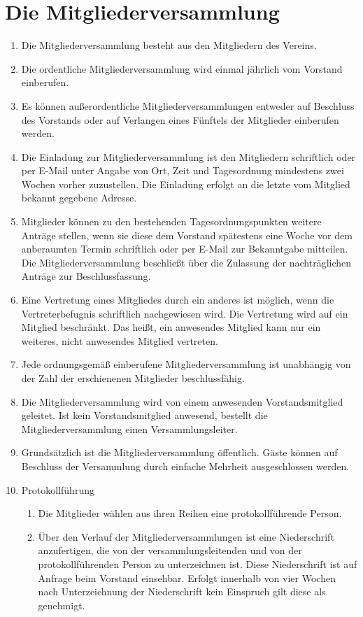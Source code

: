 \documentclass[a4paper, 12pt]{scrartcl}
\begin{document}
\section{Die Mitgliederversammlung}
\label{die-mv}
\begin{enumerate}
	\item Die Mitgliederversammlung besteht aus den Mitgliedern des Vereins.
	\item Die ordentliche Mitgliederversammlung wird einmal jährlich vom   Vorstand einberufen.
	\item Es können außerordentliche Mitgliederversammlungen entweder auf Beschluss des Vorstands oder auf Verlangen eines Fünftels der Mitglieder einberufen werden.
	\item \label{mv-einladung} Die Einladung zur Mitgliederversammlung ist den Mitgliedern schriftlich oder per E-Mail unter Angabe von Ort, Zeit und Tagesordnung mindestens zwei Wochen vorher zuzustellen. Die Einladung erfolgt an die letzte vom Mitglied bekannt gegebene Adresse.
	\item \label{mv-nachtrag} Mitglieder können zu den bestehenden Tagesordnungspunkten weitere Anträge stellen, wenn sie diese dem Vorstand spätestens eine Woche vor dem anberaumten Termin schriftlich oder per E-Mail zur Bekanntgabe mitteilen. Die Mitgliederversammlung beschließt über die Zulassung der nachträglichen Anträge zur Beschlussfassung.
	\item \label{mv-vertretung} Eine Vertretung eines Mitgliedes durch ein anderes ist möglich, wenn die Vertreterbefugnis schriftlich nachgewiesen wird. Die Vertretung wird auf ein Mitglied beschränkt. Das heißt, ein anwesendes Mitglied kann nur ein weiteres, nicht anwesendes Mitglied vertreten.
	\item Jede ordnungsgemäß einberufene Mitgliederversammlung ist unabhängig von der Zahl der erschienenen Mitglieder beschlussfähig.
	\item Die Mitgliederversammlung wird von einem anwesenden Vorstandsmitglied geleitet. Ist kein Vorstandsmitglied anwesend, bestellt die Mitgliederversammlung einen Versammlungsleiter.
	\item Grundsätzlich ist die Mitgliederversammlung öffentlich. Gäste können auf Beschluss der Versammlung durch einfache Mehrheit ausgeschlossen werden.
	\item{Protokollführung}
		\begin{enumerate}
			\item Die Mitglieder wählen aus ihren Reihen eine protokollführende Person.
			\item Über den Verlauf der Mitgliederversammlungen ist eine Niederschrift anzufertigen, die von der versammlungsleitenden und von der protokollführenden Person zu unterzeichnen ist. Diese Niederschrift ist auf Anfrage beim Vorstand einsehbar. Erfolgt innerhalb von vier Wochen nach Unterzeichnung der Niederschrift kein Einspruch gilt diese als genehmigt.

\end{enumerate}
\end{enumerate}
\end{document}
